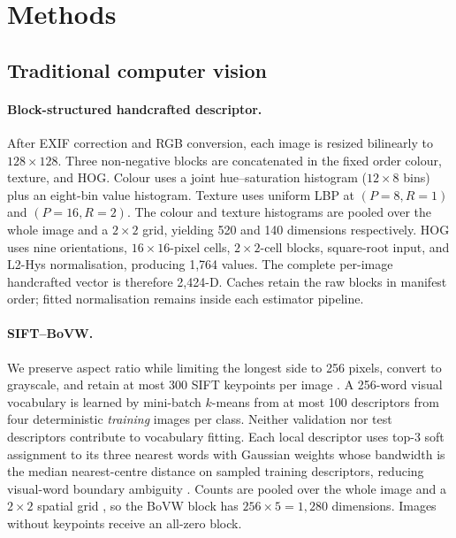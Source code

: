 \section{Methods}
\label{sec:methods}

\subsection{Traditional computer vision}

\paragraph{Block-structured handcrafted descriptor.}
After EXIF correction and RGB conversion, each image is resized bilinearly to
$128\!\times\!128$.  Three non-negative blocks are concatenated in the fixed
order colour, texture, and HOG.  Colour uses a joint hue--saturation histogram
($12\!\times\!8$ bins) plus an eight-bin value histogram.  Texture uses
uniform LBP at $(P{=}8,R{=}1)$ and $(P{=}16,R{=}2)$.  The colour and texture
histograms are pooled over the whole image and a $2\!\times\!2$ grid, yielding
520 and 140 dimensions respectively.  HOG uses nine orientations,
$16\!\times\!16$-pixel cells, $2\!\times\!2$-cell blocks, square-root input,
and L2-Hys normalisation, producing 1,764 values.  The complete per-image
handcrafted vector is therefore 2,424-D.  Caches retain the raw blocks in
manifest order; fitted normalisation remains inside each estimator pipeline.

\paragraph{SIFT--BoVW.}
We preserve aspect ratio while limiting the longest side to 256 pixels, convert
to grayscale, and retain at most 300 SIFT keypoints per image
\cite{lowe2004distinctive}.  A 256-word visual vocabulary is learned by
mini-batch $k$-means from at most 100 descriptors from four deterministic
\emph{training} images per class.  Neither validation nor test descriptors
contribute to vocabulary fitting.  Each local descriptor uses top-3 soft
assignment to its three nearest words with Gaussian weights whose bandwidth is the
median nearest-centre distance on sampled training descriptors, reducing
visual-word boundary ambiguity \cite{vangemert2010visual}.  Counts are pooled
over the whole image and a $2\!\times\!2$ spatial grid
\cite{lazebnik2006beyond}, so the BoVW block has
$256\!\times\!5=1{,}280$ dimensions.  Images without keypoints receive an
all-zero block.

